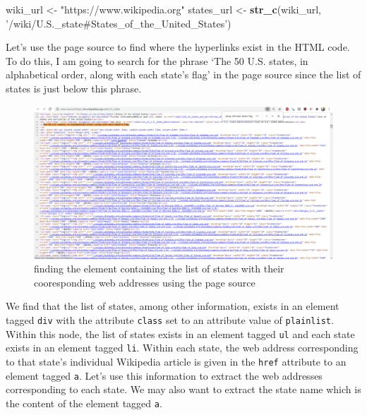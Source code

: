 \documentclass[
]{article}
\newenvironment{Shaded}{\begin{snugshade}}{\end{snugshade}}
\newcommand{\KeywordTok}[1]{\textcolor[rgb]{0.13,0.29,0.53}{\textbf{#1}}}
\newcommand{\NormalTok}[1]{#1}
\newcommand{\StringTok}[1]{\textcolor[rgb]{0.31,0.60,0.02}{#1}}
\begin{document}
\begin{Shaded}
\begin{Highlighting}[]
\NormalTok{wiki_url <-}\StringTok{ "https://www.wikipedia.org"}
\NormalTok{states_url <-}\StringTok{ }\KeywordTok{str_c}\NormalTok{(wiki_url, }\StringTok{'/wiki/U.S._state#States_of_the_United_States'}\NormalTok{)}
\end{Highlighting}
\end{Shaded}

Let's use the page source to find where the hyperlinks exist in the HTML code. To do this, I am going to search for the phrase `The 50 U.S. states, in alphabetical order, along with each state's flag' in the page source since the list of states is just below this phrase.

\begin{figure}

{\centering \includegraphics[width=22.22in]{src/images/usstates_page_source} 

}

\caption{finding the element containing the list of states with their cooresponding web addresses using the page source}\label{fig:unnamed-chunk-48}
\end{figure}

We find that the list of states, among other information, exists in an element tagged \texttt{div} with the attribute \texttt{class} set to an attribute value of \texttt{plainlist}. Within this node, the list of states exists in an element tagged \texttt{ul} and each state exists in an element tagged \texttt{li}. Within each state, the web address corresponding to that state's individual Wikipedia article is given in the \texttt{href} attribute to an element tagged \texttt{a}. Let's use this information to extract the web addresses corresponding to each state. We may also want to extract the state name which is the content of the element tagged \texttt{a}.
\end{document}
